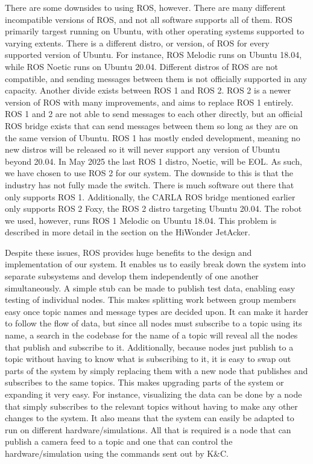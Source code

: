 \documentclass[titlepage,draft]{article}
\begin{document}
{There are some downsides to using ROS, however. There are many different incompatible versions of ROS, and not all software supports all of them. ROS primarily targest running on Ubuntu, with other operating systems supported to varying extents. There is a different distro, or version, of ROS for every supported version of Ubuntu. For instance, ROS Melodic runs on Ubuntu 18.04, while ROS Noetic runs on Ubuntu 20.04. Different distros of ROS are not compatible, and sending messages between them is not officially supported in any capacity. Another divide exists between ROS 1 and ROS 2. ROS 2 is a newer version of ROS with many improvements, and aims to replace ROS 1 entirely. ROS 1 and 2 are not able to send messages to each other directly, but an official ROS bridge exists that can send messages between them so long as they are on the same version of Ubuntu. ROS 1 has mostly ended development, meaning no new distros will be released so it will never support any version of Ubuntu beyond 20.04. In May 2025 the last ROS 1 distro, Noetic, will be EOL. As such, we have chosen to use ROS 2 for our system. The downside to this is that the industry has not fully made the switch. There is much software out there that only supports ROS 1. Additionally, the CARLA ROS bridge mentioned earlier only supports ROS 2 Foxy, the ROS 2 distro targeting Ubuntu 20.04. The robot we used, however, runs ROS 1 Melodic on Ubuntu 18.04. This problem is described in more detail in the section on the HiWonder JetAcker.

Despite these issues, ROS provides huge benefits to the design and implementation of our system. It enables us to easily break down the system into separate subsystems and develop them independently of one another simultaneously. A simple stub can be made to publish test data, enabling easy testing of individual nodes. This makes splitting work between group members easy once topic names and message types are decided upon. It can make it harder to follow the flow of data, but since all nodes must subscribe to a topic using its name, a search in the codebase for the name of a topic will reveal all the nodes that publish and subscribe to it. Additionally, because nodes just publish to a topic without having to know what is subscribing to it, it is easy to swap out parts of the system by simply replacing them with a new node that publishes and subscribes to the same topics. This makes upgrading parts of the system or expanding it very easy. For instance, visualizing the data can be done by a node that simply subscribes to the relevant topics without having to make any other changes to the system. It also means that the system can easily be adapted to run on different hardware/simulations. All that is required is a node that can publish a camera feed to a topic and one that can control the hardware/simulation using the commands sent out by K\&C.


}
\end{document}
